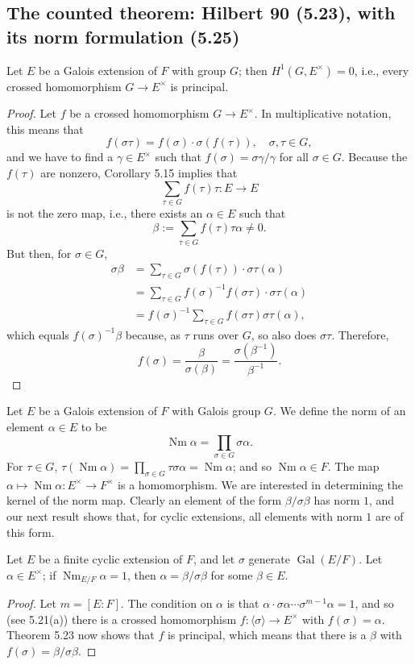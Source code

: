 \subsection*{The counted theorem: Hilbert 90 (5.23), with its norm formulation (5.25)}
\begin{theorem}[5.23]
Let $E$ be a Galois extension of $F$ with group $G$; then $H^1(G,E^\times)=0$, i.e., every crossed homomorphism $G\to E^\times$ is principal.
\end{theorem}
\begin{proof}
Let $f$ be a crossed homomorphism $G\to E^\times$. In multiplicative notation, this means that
\[
f(\sigma\tau)=f(\sigma)\cdot\sigma(f(\tau)),\quad\sigma,\tau\in G,
\]
and we have to find a $\gamma\in E^\times$ such that $f(\sigma)=\sigma\gamma/\gamma$ for all $\sigma\in G$. Because the $f(\tau)$ are nonzero, Corollary 5.15 implies that
\[
\sum_{\tau\in G}f(\tau)\tau:E\longrightarrow E
\]
is not the zero map, i.e., there exists an $\alpha\in E$ such that
\[
\beta\mathrel{:=}\sum_{\tau\in G}f(\tau)\tau\alpha\ne0.
\]
But then, for $\sigma\in G$,
\begin{align*}
\sigma\beta
&=\sum_{\tau\in G}\sigma(f(\tau))\cdot\sigma\tau(\alpha)\\
&=\sum_{\tau\in G}f(\sigma)^{-1}f(\sigma\tau)\cdot\sigma\tau(\alpha)\\
&=f(\sigma)^{-1}\sum_{\tau\in G}f(\sigma\tau)\sigma\tau(\alpha),
\end{align*}
which equals $f(\sigma)^{-1}\beta$ because, as $\tau$ runs over $G$, so also does $\sigma\tau$. Therefore,
\[
f(\sigma)=\frac{\beta}{\sigma(\beta)}=\frac{\sigma(\beta^{-1})}{\beta^{-1}}.
\]
\end{proof}
Let $E$ be a Galois extension of $F$ with Galois group $G$. We define the norm of an element $\alpha\in E$ to be
\[
\operatorname{Nm}\alpha=\prod_{\sigma\in G}\sigma\alpha.
\]
For $\tau\in G$, $\tau(\operatorname{Nm}\alpha)=\prod_{\sigma\in G}\tau\sigma\alpha=\operatorname{Nm}\alpha$; and so $\operatorname{Nm}\alpha\in F$. The map $\alpha\mapsto\operatorname{Nm}\alpha:E^\times\to F^\times$ is a homomorphism.
We are interested in determining the kernel of the norm map. Clearly an element of the form $\beta/\sigma\beta$ has norm $1$, and our next result shows that, for cyclic extensions, all elements with norm $1$ are of this form.
\begin{corollary}
Let $E$ be a finite cyclic extension of $F$, and let $\sigma$ generate $\operatorname{Gal}(E/F)$. Let $\alpha\in E^\times$; if $\operatorname{Nm}_{E/F}\alpha=1$, then $\alpha=\beta/\sigma\beta$ for some $\beta\in E$.
\end{corollary}
\begin{proof}
Let $m=[E:F]$. The condition on $\alpha$ is that $\alpha\cdot\sigma\alpha\cdots\sigma^{m-1}\alpha=1$, and so (see 5.21(a)) there is a crossed homomorphism $f:\langle\sigma\rangle\to E^\times$ with $f(\sigma)=\alpha$. Theorem 5.23 now shows that $f$ is principal, which means that there is a $\beta$ with $f(\sigma)=\beta/\sigma\beta$.
\end{proof}
